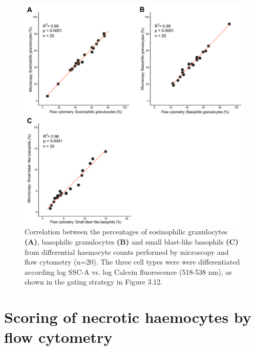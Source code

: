 \begin{figure}[H]
    \centering
    \includegraphics[width=1.0\textwidth]{figures/Gating strategy/SSC Calcein validation.pdf}
    \caption{Correlation between the percentages of eosinophilic granulocytes \textbf{(A)}, basophilic granulocytes \textbf{(B)} and small blast-like basophils \textbf{(C)} from differential haemocyte counts performed by microscopy and flow cytometry (n=20). The three cell types were were differentiated according log SSC-A vs. log Calcein fluorescence (518-538 nm), as shown in the gating strategy in Figure 3.12. }
    \label{fig:DHC_lin}
\end{figure}



\newpage




\section{Scoring of necrotic haemocytes by flow cytometry}
